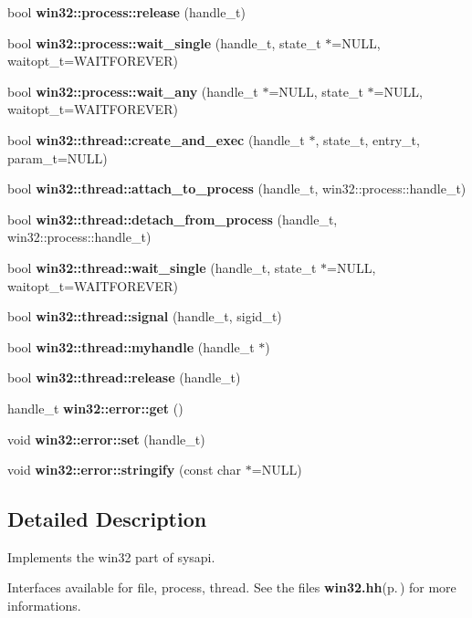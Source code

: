 \begin{CompactItemize}
\item 
bool {\bf win32::process::release} (handle\_\-t)\label{namespacewin32_1_1process_99f84f68ac313c62dff02d80a1420ce3}

\item 
bool {\bf win32::process::wait\_\-single} (handle\_\-t, state\_\-t $\ast$=NULL, waitopt\_\-t=WAITFOREVER)\label{namespacewin32_1_1process_55e9b7961f6b3ab3385182cc60a0c6a8}

\item 
bool {\bf win32::process::wait\_\-any} (handle\_\-t $\ast$=NULL, state\_\-t $\ast$=NULL, waitopt\_\-t=WAITFOREVER)\label{namespacewin32_1_1process_2eab9d48905f56c080d19dc924f93838}

\item 
bool {\bf win32::thread::create\_\-and\_\-exec} (handle\_\-t $\ast$, state\_\-t, entry\_\-t, param\_\-t=NULL)\label{namespacewin32_1_1thread_2b344cfe84d03cbbe97979cbb21d0a28}

\item 
bool {\bf win32::thread::attach\_\-to\_\-process} (handle\_\-t, win32::process::handle\_\-t)\label{namespacewin32_1_1thread_31adac8080174903ecdf0ed1a1e3c3fc}

\item 
bool {\bf win32::thread::detach\_\-from\_\-process} (handle\_\-t, win32::process::handle\_\-t)\label{namespacewin32_1_1thread_ac6401beea5ae870ebe3224e254a54e0}

\item 
bool {\bf win32::thread::wait\_\-single} (handle\_\-t, state\_\-t $\ast$=NULL, waitopt\_\-t=WAITFOREVER)\label{namespacewin32_1_1thread_55e9b7961f6b3ab3385182cc60a0c6a8}

\item 
bool {\bf win32::thread::signal} (handle\_\-t, sigid\_\-t)\label{namespacewin32_1_1thread_65bed66a4a1fb5aaa466cdf76c2c361c}

\item 
bool {\bf win32::thread::myhandle} (handle\_\-t $\ast$)\label{namespacewin32_1_1thread_7fcb06bda957687be5f81acc6b32ea65}

\item 
bool {\bf win32::thread::release} (handle\_\-t)\label{namespacewin32_1_1thread_99f84f68ac313c62dff02d80a1420ce3}

\item 
handle\_\-t {\bf win32::error::get} ()\label{namespacewin32_1_1error_712109514c51d8578a1a5952b71603f1}

\item 
void {\bf win32::error::set} (handle\_\-t)\label{namespacewin32_1_1error_c94a297e7e8ff03099c32383871939a4}

\item 
void {\bf win32::error::stringify} (const char $\ast$=NULL)\label{namespacewin32_1_1error_5dcac4f5db06efad933e2ebb8bd314e2}

\end{CompactItemize}


\subsection{Detailed Description}
Implements the win32 part of sysapi. 

Interfaces available for file, process, thread. See the files {\bf win32.hh}{\rm (p.\,\pageref{win32_8hh})} for more informations. 